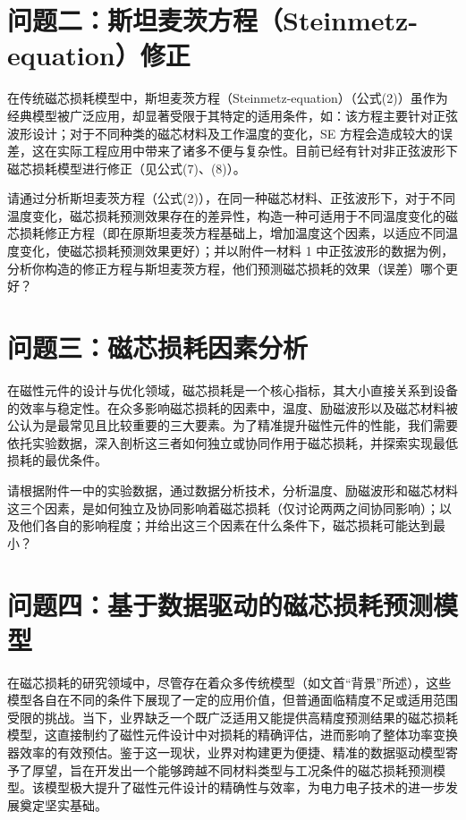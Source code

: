 \documentclass[a4paper,12pt]{ctexart}
\begin{document}
\section{问题二：斯坦麦茨方程（Steinmetz-equation）修正}

在传统磁芯损耗模型中，斯坦麦茨方程（Steinmetz-equation）（公式(2)）虽作为经典模型被广泛应用，却显著受限于其特定的适用条件，如：该方程主要针对正弦波形设计；对于不同种类的磁芯材料及工作温度的变化，SE 方程会造成较大的误差，这在实际工程应用中带来了诸多不便与复杂性。目前已经有针对非正弦波形下磁芯损耗模型进行修正（见公式(7)、(8)）。

请通过分析斯坦麦茨方程（公式(2)），在同一种磁芯材料、正弦波形下，对于不同温度变化，磁芯损耗预测效果存在的差异性，构造一种可适用于不同温度变化的磁芯损耗修正方程（即在原斯坦麦茨方程基础上，增加温度这个因素，以适应不同温度变化，使磁芯损耗预测效果更好）；并以附件一材料 1 中正弦波形的数据为例，分析你构造的修正方程与斯坦麦茨方程，他们预测磁芯损耗的效果（误差）哪个更好？

\section{问题三：磁芯损耗因素分析}

在磁性元件的设计与优化领域，磁芯损耗是一个核心指标，其大小直接关系到设备的效率与稳定性。在众多影响磁芯损耗的因素中，温度、励磁波形以及磁芯材料被公认为是最常见且比较重要的三大要素。为了精准提升磁性元件的性能，我们需要依托实验数据，深入剖析这三者如何独立或协同作用于磁芯损耗，并探索实现最低损耗的最优条件。

请根据附件一中的实验数据，通过数据分析技术，分析温度、励磁波形和磁芯材料这三个因素，是如何独立及协同影响着磁芯损耗（仅讨论两两之间协同影响）；以及他们各自的影响程度；并给出这三个因素在什么条件下，磁芯损耗可能达到最小？

\section{问题四：基于数据驱动的磁芯损耗预测模型}

在磁芯损耗的研究领域中，尽管存在着众多传统模型（如文首“背景”所述），这些模型各自在不同的条件下展现了一定的应用价值，但普通面临精度不足或适用范围受限的挑战。当下，业界缺乏一个既广泛适用又能提供高精度预测结果的磁芯损耗模型，这直接制约了磁性元件设计中对损耗的精确评估，进而影响了整体功率变换器效率的有效预估。鉴于这一现状，业界对构建更为便捷、精准的数据驱动模型寄予了厚望，旨在开发出一个能够跨越不同材料类型与工况条件的磁芯损耗预测模型。该模型极大提升了磁性元件设计的精确性与效率，为电力电子技术的进一步发展奠定坚实基础。
\end{document}

